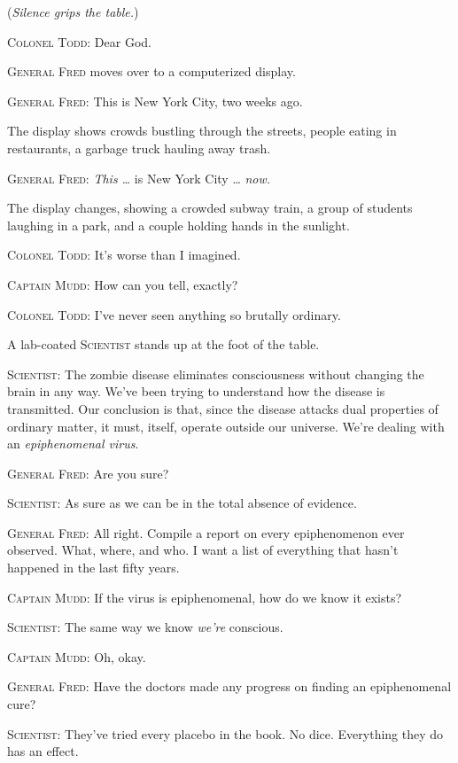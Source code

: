 {
 (\textit{Silence grips the table.})}

{
 \textsc{Colonel Todd}: Dear God.}

{
 \textsc{General Fred} moves over to a computerized display.}

{
 \textsc{General Fred}: This is New York City, two weeks ago.}

{
 The display shows crowds bustling through the streets, people
eating in restaurants, a garbage truck hauling away trash.}

{
 \textsc{General Fred}: \textit{This \ldots} is New York City \ldots
\textit{now.}}

{
 The display changes, showing a crowded subway train, a group of
students laughing in a park, and a couple holding hands in the
sunlight.}

{
 \textsc{Colonel Todd}: It's worse than I imagined.}

{
 \textsc{Captain Mudd}: How can you tell, exactly?}

{
 \textsc{Colonel Todd}: I've never seen anything so brutally
ordinary.}

{
 A lab-coated \textsc{Scientist} stands up at the foot of the table.}

{
 \textsc{Scientist}: The zombie disease eliminates consciousness without
changing the brain in any way. We've been trying to
understand how the disease is transmitted. Our conclusion is that,
since the disease attacks dual properties of ordinary matter, it must,
itself, operate outside our universe. We're dealing
with an \textit{epiphenomenal virus}.}

{
 \textsc{General Fred}: Are you sure?}

{
 \textsc{Scientist}: As sure as we can be in the total absence of evidence.}

{
 \textsc{General Fred}: All right. Compile a report on every epiphenomenon
ever observed. What, where, and who. I want a list of everything that
hasn't happened in the last fifty years.}

{
 \textsc{Captain Mudd}: If the virus is epiphenomenal, how do we know it
exists?}

{
 \textsc{Scientist}: The same way we know \textit{we're}
conscious.}

{
 \textsc{Captain Mudd}: Oh, okay.}

{
 \textsc{General Fred}: Have the doctors made any progress on finding an
epiphenomenal cure?}

{
 \textsc{Scientist}: They've tried every placebo in the
book. No dice. Everything they do has an effect.}

